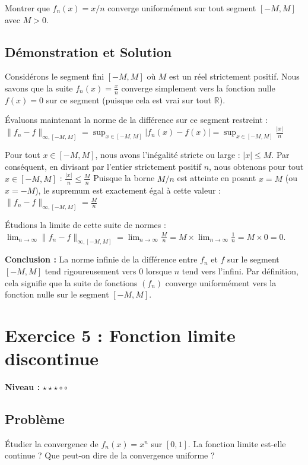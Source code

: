\documentclass{report}
\begin{document}
Montrer que $f_n(x) = x/n$ converge uniformément sur tout segment $[-M, M]$ avec $M > 0$.

\section*{Démonstration et Solution}

Considérons le segment fini $[-M, M]$ où $M$ est un réel strictement positif.
Nous savons que la suite $f_n(x) = \frac{x}{n}$ converge simplement vers la fonction nulle $f(x) = 0$ sur ce segment (puisque cela est vrai sur tout $\mathbb{R}$).

Évaluons maintenant la norme de la différence sur ce segment restreint :
$\|f_n - f\|_{\infty, [-M,M]} = \sup_{x \in [-M, M]} |f_n(x) - f(x)| = \sup_{x \in [-M, M]} \frac{|x|}{n}$

Pour tout $x \in [-M, M]$, nous avons l'inégalité stricte ou large : $|x| \leq M$.
Par conséquent, en divisant par l'entier strictement positif $n$, nous obtenons pour tout $x \in [-M, M]$ :
$\frac{|x|}{n} \leq \frac{M}{n}$
Puisque la borne $M/n$ est atteinte en posant $x=M$ (ou $x=-M$), le supremum est exactement égal à cette valeur :
$\|f_n - f\|_{\infty, [-M,M]} = \frac{M}{n}$

Étudions la limite de cette suite de normes :
$\lim_{n \to \infty} \|f_n - f\|_{\infty, [-M,M]} = \lim_{n \to \infty} \frac{M}{n} = M \times \lim_{n \to \infty} \frac{1}{n} = M \times 0 = 0$.

\textbf{Conclusion :}
La norme infinie de la différence entre $f_n$ et $f$ sur le segment $[-M, M]$ tend rigoureusement vers 0 lorsque $n$ tend vers l'infini. Par définition, cela signifie que la suite de fonctions $(f_n)$ converge uniformément vers la fonction nulle sur le segment $[-M, M]$.

\newpage


\chapter*{Exercice 5 : Fonction limite discontinue}

\textbf{Niveau :} $\star \star \star \circ \circ $

\section*{Problème}

Étudier la convergence de $f_n(x) = x^n$ sur $[0,1]$. La fonction limite est-elle continue ? Que peut-on dire de la convergence uniforme ?
\end{document}
